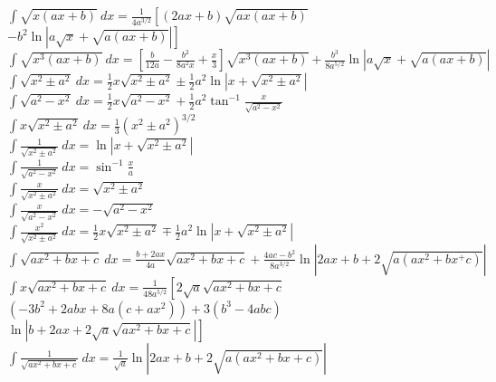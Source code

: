 \documentclass[10pt,letterpaper,landscape]{cheatsheet}
\begin{document}
$
\int \sqrt{x(ax+b)}\ dx = \frac{1}{4a^{3/2}}\left[(2ax + b)\sqrt{ax(ax+b)} 
\right. $\\$  \left.-b^2 \ln \left| a\sqrt{x} + \sqrt{a(ax+b)} \right| \right] 
$\\

$
\int \sqrt{x^3(ax+b)} \ dx =\left[ 
\frac{b}{12a}-
\frac{b^2}{8a^2x}+
\frac{x}{3}\right] 
\sqrt{x^3(ax+b)}  + 
\frac{b^3}{8a^{5/2}}\ln \left| a\sqrt{x} + \sqrt{a(ax+b)} \right|
$\\

$
\int\sqrt{x^2 \pm a^2}\ dx = \frac{1}{2}x\sqrt{x^2\pm a^2} 
\pm\frac{1}{2}a^2 \ln \left| x + \sqrt{x^2\pm a^2} \right| 
$\\

$
\int  \sqrt{a^2 - x^2}\ dx = \frac{1}{2} x \sqrt{a^2-x^2} 
+\frac{1}{2}a^2\tan^{-1}\frac{x}{\sqrt{a^2-x^2}}
$\\

$
\int  x \sqrt{x^2 \pm a^2}\ dx= \frac{1}{3}\left( x^2 \pm a^2 \right)^{3/2} 
$\\

$
\int \frac{1}{\sqrt{x^2 \pm a^2}}\ dx = \ln \left| x + \sqrt{x^2 \pm a^2} \right| 
$\\

$
\int \frac{1}{\sqrt{a^2 - x^2}}\ dx = \sin^{-1}\frac{x}{a} 
$\\

$
\int \frac{x}{\sqrt{x^2\pm a^2}}\ dx = \sqrt{x^2 \pm a^2} 
$\\

$
\int \frac{x}{\sqrt{a^2-x^2}}\ dx = -\sqrt{a^2-x^2} 
$\\

$
\int \frac{x^2}{\sqrt{x^2 \pm a^2}}\ dx = \frac{1}{2}x\sqrt{x^2 \pm a^2}
\mp \frac{1}{2}a^2 \ln \left| x + \sqrt{x^2\pm a^2} \right| 
$\\

$
\int \sqrt{a x^2 + b x + c}\ dx = 
\frac{b+2ax}{4a}\sqrt{ax^2+bx+c}
+
\frac{4ac-b^2}{8a^{3/2}}\ln \left| 2ax + b + 2\sqrt{a(ax^2+bx^+c)}\right|
$\\

$
\int x \sqrt{a x^2 + bx + c}\ dx = \frac{1}{48a^{5/2}}\left[
2 \sqrt{a} \sqrt{ax^2+bx+c}\right.$\\
$
  \left( - 3b^2 + 2 abx + 8 a(c+ax^2) \right)
 + 3(b^3-4abc)$\\
 $\left.\ln \left|b + 2ax + 2\sqrt{a}\sqrt{ax^2+bx+c} \right| \right]
$\\

$
\int\frac{1}{\sqrt{ax^2+bx+c}}\ dx=
\frac{1}{\sqrt{a}}\ln \left| 2ax+b + 2 \sqrt{a(ax^2+bx+c)} \right| 
$\\
\end{document}
